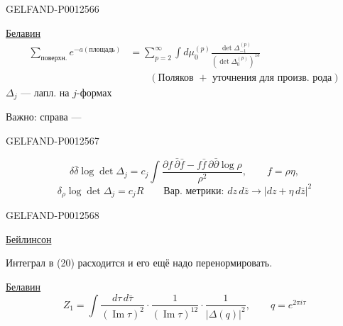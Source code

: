 \begin{GelfandAdjacentEvidence}{GELFAND-P001256}{6}


\underline{\underline{Белавин}}
\begin{equation*}
\begin{aligned}
\sum_{\text{поверхн.}}e^{-a(\text{площадь})}
&=\sum_{p=2}^{\infty}\int d\mu_0^{(p)}
\frac{\det\Delta_{-1}^{(p)}}{(\det\Delta_0^{(p)})^{13}}\\[-1pt]
&\hspace{2em}(\text{Поляков $+$ уточнения для произв. рода})
\end{aligned}\tag{20}
\end{equation*}
$\Delta_j$ — лапл. на $j$-формах

Важно: справа —
\end{GelfandAdjacentEvidence}
\begin{GelfandAdjacentEvidence}{GELFAND-P001256}{7}


\begin{equation*}
\delta\bar\delta\log\det\Delta_j
=c_j\int\frac{\partial f\,\bar\partial\bar f
-f\bar f\,\partial\bar\partial\log\rho}{\rho^2},
\qquad f=\rho\eta,\tag{21}
\end{equation*}
\begin{equation*}
\delta_{\rho}\log\det\Delta_j=c_jR
\qquad\text{Вар. метрики: }dz\,d\bar z\longrightarrow\lvert dz+\eta\,d\bar z\rvert^2
\tag{21'}
\end{equation*}
\end{GelfandAdjacentEvidence}
\begin{GelfandAdjacentEvidence}{GELFAND-P001256}{8}


\underline{Бейлинсон}

Интеграл в (20) расходится и его ещё надо перенормировать.

\underline{Белавин}
\begin{equation*}
Z_1=\int\frac{d\tau\,d\bar\tau}{(\operatorname{Im}\tau)^2}
\cdot\frac{1}{(\operatorname{Im}\tau)^{12}}\cdot\frac{1}{\lvert\Delta(q)\rvert^2},
\qquad q=e^{2\pi i\tau}
\end{equation*}
\end{GelfandAdjacentEvidence}

